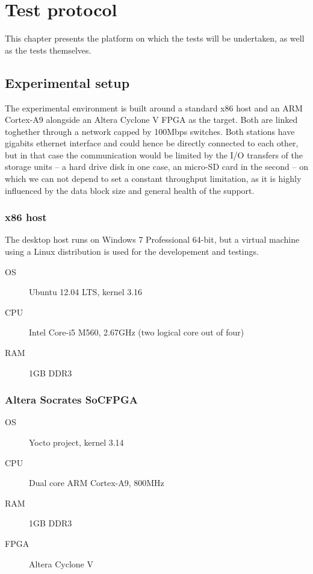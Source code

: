 \chapter{Test protocol}\label{chap:test-protocol}
This chapter presents the platform on which the tests will be undertaken, as well as the tests themselves.



\section{Experimental setup}
The experimental environment is built around a standard x86 host and an ARM Cortex-A9 alongside an Altera Cyclone V FPGA as the target.
Both are linked toghether through a network capped by 100Mbps switches.
Both stations have gigabits ethernet interface and could hence be directly connected to each other, but in that case the communication would be limited by the I/O transfers of the storage units -- a hard drive disk in one case, an micro-SD card in the second -- on which we can not depend to set a constant throughput limitation, as it is highly influenced by the data block size and general health of the support.


\subsection{x86 host}
The desktop host runs on Windows 7 Professional 64-bit, but a virtual machine using a Linux distribution is used for the developement and testings.

\begin{framed}
\begin{description}
	\item[OS] Ubuntu 12.04 LTS, kernel 3.16
	\item[CPU] Intel Core-i5 M560, 2.67GHz (two logical core out of four)
	\item[RAM] 1GB DDR3
\end{description}
\end{framed}

\subsection{Altera Socrates SoCFPGA}

\begin{framed}
\begin{description}
	\item[OS] Yocto project, kernel 3.14
	\item[CPU] Dual core ARM Cortex-A9, 800MHz
	\item[RAM] 1GB DDR3
	\item[FPGA] Altera Cyclone V
\end{description}
\end{framed}

